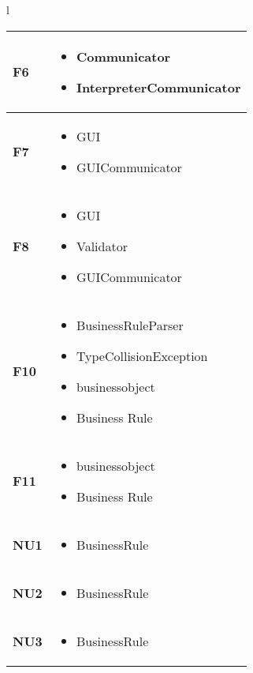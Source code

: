 \large{
\begin{tabular}{l}
\begin{tabular}{||p{3cm}||p{9cm}||} \hline
\textbf{F6} & 
\begin{itemize}
\item Communicator
\item InterpreterCommunicator
\end{itemize} \\ \hline

\textbf{F7} & 
\begin{itemize}
\item GUI
\item GUICommunicator
\end{itemize} \\ \hline
\textbf{F8} & 
\begin{itemize}
\item GUI
\item Validator
\item GUICommunicator
\end{itemize} \\ \hline
\textbf{F10} & 
\begin{itemize}
\item BusinessRuleParser
\item TypeCollisionException
\item businessobject
\item Business Rule
\end{itemize} \\ \hline
\textbf{F11} & 
\begin{itemize}
\item businessobject
\item Business Rule
\end{itemize} \\ \hline
\textbf{NU1} & 
\begin{itemize}
\item BusinessRule
\end{itemize} \\ \hline
\textbf{NU2} & 
\begin{itemize}
\item BusinessRule
\end{itemize} \\ \hline
\textbf{NU3} & 
\begin{itemize}
\item BusinessRule
\end{itemize} \\ \hline

\end{tabular} \\
\end{tabular}
}

